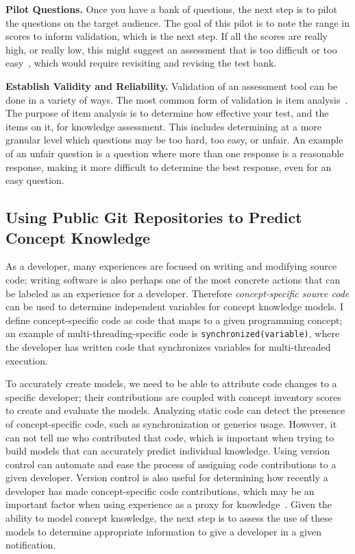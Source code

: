 \documentclass{llncs}
\begin{document}
\vspace*{0.5em}

\noindent\textbf{Pilot Questions.} Once you have a bank of questions, the next step is to pilot the questions on the target audience. The goal of this pilot is to note the range in scores to inform validation, which is the next step. If all the scores are really high, or really low, this might suggest an assessment that is too difficult or too easy~\cite{nelson1967testing}, which would require revisiting and revising the test bank.

\vspace*{0.5em}

\noindent \textbf{Establish Validity and Reliability.} Validation of an assessment tool can be done in a variety of ways. The most common form of validation is item analysis~\cite{gorsuch1997exploratory}. The purpose of item analysis is to determine how effective your test, and the items on it, for knowledge assessment. This includes determining at a more granular level which questions may be too hard, too easy, or unfair. 
An example of an unfair question is a question where more than one response is a reasonable response, making it more difficult to determine the best response, even for an easy question.


\subsection{Using Public Git Repositories to Predict Concept Knowledge}
As a developer, many experiences are focused on writing and modifying source code; writing software is also perhaps one of the most concrete actions that can be labeled as an experience for a developer. Therefore \emph{concept-specific source code} can be used to determine independent variables for concept knowledge models. I define concept-specific code as code that maps to a given programming concept; an example of multi-threading-specific code is \texttt{synchronized(variable)}, where the developer has written code that synchronizes variables for multi-threaded execution.

To accurately create models, we need to be able to attribute code changes to a specific developer; their contributions are coupled with concept inventory scores to create and evaluate the models. Analyzing static code can detect the presence of concept-specific code, such as synchronization or generics usage. However, it can not tell me who contributed that code, which is important when trying to build models that can accurately predict individual knowledge. 
Using version control can automate and ease the process of assigning code contributions to a given developer. 
Version control is also useful for determining how recently a developer has made concept-specific code contributions, which may be an important factor when using experience as a proxy for knowledge~\cite{johnson2015bespoke}. %
Given the ability to model concept knowledge, the next step is to assess the use of these models to determine appropriate information to give a developer in a given notification.
\end{document}
